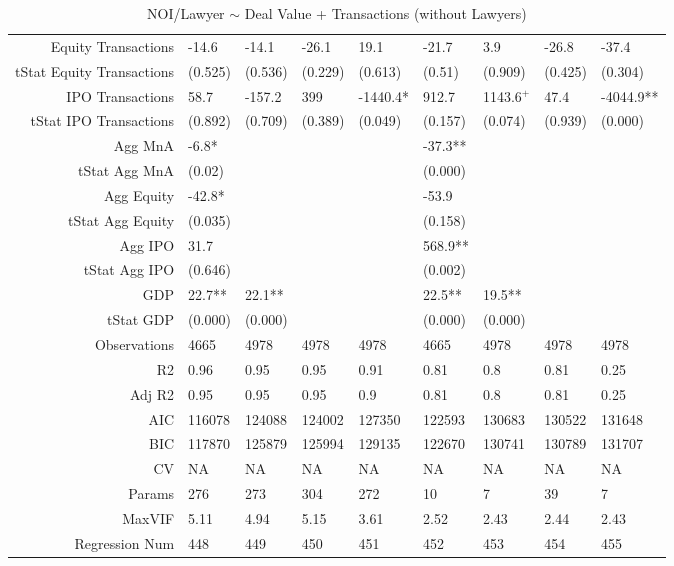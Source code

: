 \begin{table}[ht]
\begin{tabular}{rllllllll}
  Equity Transactions & -14.6 & -14.1 & -26.1 & 19.1 & -21.7 & 3.9 & -26.8 & -37.4 \\ 
  tStat Equity Transactions & (0.525) & (0.536) & (0.229) & (0.613) & (0.51) & (0.909) & (0.425) & (0.304) \\ 
  IPO Transactions & 58.7 & -157.2 & 399 & -1440.4* & 912.7 & 1143.6$^{+}$ & 47.4 & -4044.9** \\ 
  tStat IPO Transactions & (0.892) & (0.709) & (0.389) & (0.049) & (0.157) & (0.074) & (0.939) & (0.000) \\ 
  Agg MnA & -6.8* &  &  &  & -37.3** &  &  &  \\ 
  tStat Agg MnA & (0.02) &  &  &  & (0.000) &  &  &  \\ 
  Agg Equity & -42.8* &  &  &  & -53.9 &  &  &  \\ 
  tStat Agg Equity & (0.035) &  &  &  & (0.158) &  &  &  \\ 
  Agg IPO & 31.7 &  &  &  & 568.9** &  &  &  \\ 
  tStat Agg IPO & (0.646) &  &  &  & (0.002) &  &  &  \\ 
  GDP & 22.7** & 22.1** &  &  & 22.5** & 19.5** &  &  \\ 
  tStat GDP & (0.000) & (0.000) &  &  & (0.000) & (0.000) &  &  \\ 
  Observations & 4665 & 4978 & 4978 & 4978 & 4665 & 4978 & 4978 & 4978 \\ 
  R2 & 0.96 & 0.95 & 0.95 & 0.91 & 0.81 & 0.8 & 0.81 & 0.25 \\ 
  Adj R2 & 0.95 & 0.95 & 0.95 & 0.9 & 0.81 & 0.8 & 0.81 & 0.25 \\ 
  AIC & 116078 & 124088 & 124002 & 127350 & 122593 & 130683 & 130522 & 131648 \\ 
  BIC & 117870 & 125879 & 125994 & 129135 & 122670 & 130741 & 130789 & 131707 \\ 
  CV & NA & NA & NA & NA & NA & NA & NA & NA \\ 
  Params & 276 & 273 & 304 & 272 & 10 & 7 & 39 & 7 \\ 
  MaxVIF & 5.11 & 4.94 & 5.15 & 3.61 & 2.52 & 2.43 & 2.44 & 2.43 \\ 
  Regression Num & 448 & 449 & 450 & 451 & 452 & 453 & 454 & 455 \\ 
   \hline
\end{tabular}
\caption{NOI/Lawyer $\sim$ Deal Value + Transactions (without Lawyers)} 
\end{table}

